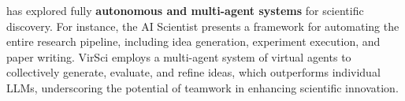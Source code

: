     has 
    explored fully \textbf{autonomous and multi-agent systems} for scientific discovery. For instance, the AI Scientist \citep{lu2024aiscientist} presents a framework for automating the entire research pipeline, including idea generation, experiment execution, and paper writing. 
    VirSci \citep{su2024two} employs a multi-agent system %
    of virtual agents to collectively generate, evaluate, and refine ideas, %
    which outperforms individual LLMs, underscoring the potential of teamwork in enhancing scientific innovation.








